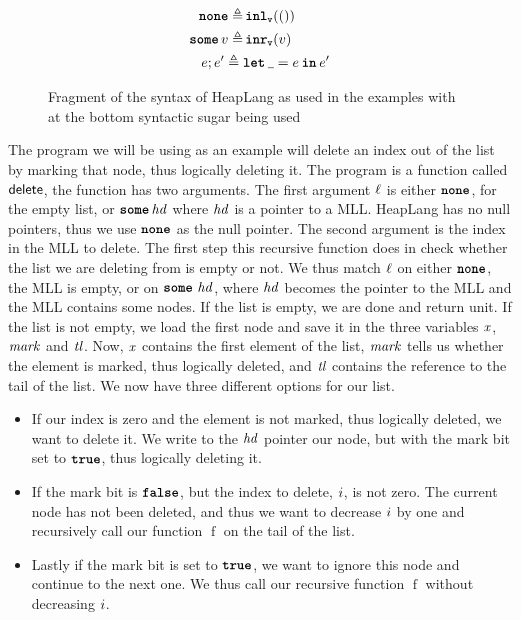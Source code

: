 \documentclass[thesis.tex]{subfiles}
\begin{document}
\begin{figure}[ht]
\begin{center}
\begin{align*}
      \None \eqdef                        & \InlV(\TT)                                                                   \\
      \Some \val \eqdef                   & \InrV(\val)                                                                  \\
      \expr; \expr' \eqdef{}              & \Let \any = \expr in \expr'
    \end{align*}
    \caption{Fragment of the syntax of HeapLang as used in the examples with at the bottom syntactic sugar being used}
    \label{fig:heaplangsyntax}
  \end{center}
\end{figure}

The program we will be using as an example will delete an index out of the list by marking that node, thus logically deleting it.
\MLLDeleteProg
The program is a function called $\textsf{\upshape delete}$, the function has two arguments. The first argument $\ell$ is either $\operatorname{\texttt{\bfseries none}}$, for the empty list, or $\operatorname{\texttt{\bfseries some}} \mathit{hd}$ where $\mathit{hd}$ is a pointer to a MLL. HeapLang has no null pointers, thus we use $\operatorname{\texttt{\bfseries none}}$ as the null pointer. The second argument is the index in the MLL to delete. The first step this recursive function does in check whether the list we are deleting from is empty or not. We thus match $\ell$ on either $\operatorname{\texttt{\bfseries none}}$, the MLL is empty, or on $\operatorname{\texttt{\bfseries some}}\,\mathit{hd}$, where $\mathit{hd}$ becomes the pointer to the MLL and the MLL contains some nodes. If the list is empty, we are done and return unit. If the list is not empty, we load the first node and save it in the three variables $\mathit{x}$, $\mathit{mark}$ and $\mathit{tl}$. Now, $\mathit{x}$ contains the first element of the list, $\mathit{mark}$ tells us whether the element is marked, thus logically deleted, and $\mathit{tl}$ contains the reference to the tail of the list. We now have three different options for our list.
\begin{itemize}
  \item If our index is zero and the element is not marked, thus logically deleted, we want to delete it. We write to the $\mathit{hd}$ pointer our node, but with the mark bit set to $\texttt{\bfseries true}$, thus logically deleting it.
  \item If the mark bit is $\texttt{\bfseries false}$, but the index to delete, $i$, is not zero. The current node has not been deleted, and thus we want to decrease $i$ by one and recursively call our function $\operatorname{f}$ on the tail of the list.
  \item Lastly if the mark bit is set to $\texttt{\bfseries true}$, we want to ignore this node and continue to the next one. We thus call our recursive function $\operatorname{f}$ without decreasing $i$.
\end{itemize}
\end{document}
